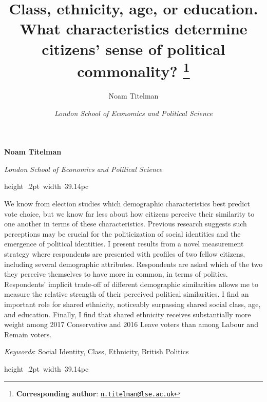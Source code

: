 \documentclass[a4paper]{cupjournal}
\title{Class, ethnicity, age, or education. What characteristics determine citizens' sense of political commonality? \thanks{\textbf{Corresponding author}: \href{mailto:n.titelman@lse.ac.uk}{\nolinkurl{n.titelman@lse.ac.uk}}}  }
\author{\Large Noam Titelman\vspace{0.05in} \newline\normalsize\emph{}   \and \Large \vspace{0.05in} \newline\normalsize\emph{London School of Economics and Political Science}  }
\date{}
\renewenvironment{abstract}
 {{%
    \setlength{\leftmargin}{0mm}
    \setlength{\rightmargin}{\leftmargin}%
  }%
  \relax}
 {\endlist}
\begin{document}
	
%    


{%
\setlength{\parindent}{0pt}
\thispagestyle{plain}
{\fontsize{18}{20}\selectfont\raggedright 
\maketitle  %

}

{
   \vskip 13.5pt\relax \normalsize\fontsize{11}{12} 
\textbf{Noam Titelman} \hskip 15pt \emph{\small }   \par \textbf{} \hskip 15pt \emph{\small London School of Economics and Political Science}   

}

}







\begin{abstract}

    \hbox{\vrule height .2pt width 39.14pc}

    \vskip 8.5pt %

\noindent We know from election studies which demographic characteristics best predict vote choice, but we know far less about how citizens perceive their similarity to one another in terms of these characteristics. Previous research suggests such perceptions may be crucial for the politicization of social identities and the emergence of political identities. I present results from a novel measurement strategy where respondents are presented with profiles of two fellow citizens, including several demographic attributes. Respondents are asked which of the two they perceive themselves to have more in common, in terms of politics. Respondents' implicit trade-off of different demographic similarities allows me to measure the relative strength of their perceived political similarities. I find an important role for shared ethnicity, noticeably surpassing shared social class, age, and education. Finally, I find that shared ethnicity receives substantially more weight among 2017 Conservative and 2016 Leave voters than among Labour and Remain voters.


\vskip 8.5pt \noindent \emph{Keywords}: Social Identity, Class, Ethnicity, British Politics \par

    \hbox{\vrule height .2pt width 39.14pc}



\end{abstract}
\end{document}
